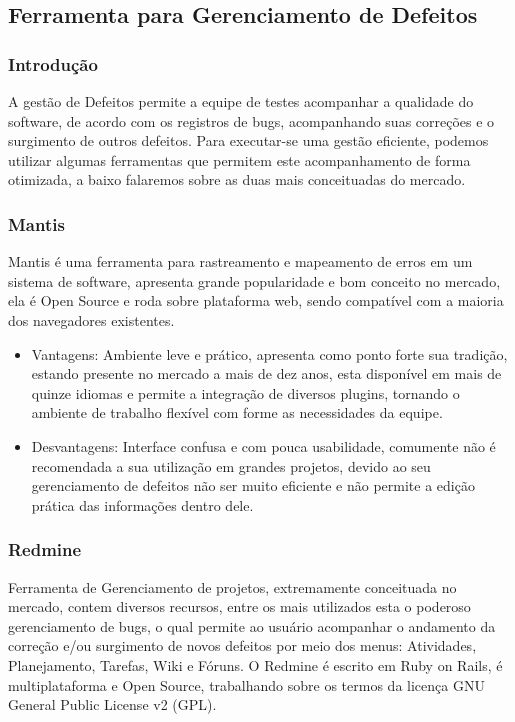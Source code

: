 \documentclass[12pt,a4paper]{article}
\begin{document}
	\clearpage		
	\subsection{Ferramenta para Gerenciamento de Defeitos}
		\subsubsection{Introdução}
		
			A gestão de Defeitos permite a equipe de testes acompanhar a qualidade do software, 
			de acordo com os registros de bugs, acompanhando suas correções e o surgimento de outros defeitos. 
			Para executar-se uma gestão eficiente, podemos utilizar algumas ferramentas que permitem este acompanhamento de forma otimizada, 
			a baixo falaremos sobre as duas mais conceituadas do mercado.
			
		\subsubsection{Mantis}
		
			Mantis é uma ferramenta para rastreamento e mapeamento de erros em um sistema de software, 
			apresenta grande popularidade e bom conceito no mercado, ela é Open Source e roda sobre plataforma web, 
			sendo compatível com a maioria dos navegadores existentes.

				\begin{itemize}
					\item Vantagens: 
						Ambiente leve e prático, apresenta como ponto forte sua tradição, estando presente no mercado a mais de dez anos, 
					  esta disponível em mais de quinze idiomas e permite a integração de diversos plugins, tornando o ambiente de trabalho flexível
					  com forme as necessidades da equipe. 					
					\item Desvantagens:
						Interface confusa e com pouca usabilidade, comumente não é recomendada a sua utilização em grandes projetos, 
						devido ao seu gerenciamento de defeitos não ser muito eficiente e não permite a edição prática das informações dentro dele. 
				\end{itemize}
						
		\subsubsection{Redmine}
		
			 Ferramenta de Gerenciamento de projetos, extremamente conceituada no mercado, contem diversos recursos, 
			 entre os mais utilizados esta o poderoso gerenciamento de bugs, o qual permite ao usuário acompanhar o 
			 andamento da correção e/ou surgimento de novos defeitos por meio dos menus: Atividades, Planejamento, Tarefas, Wiki e Fóruns.
			 O Redmine é escrito em Ruby on Rails, é multiplataforma e Open Source, trabalhando sobre os termos da licença GNU
			 General Public License v2 (GPL).
			 
\end{document}
